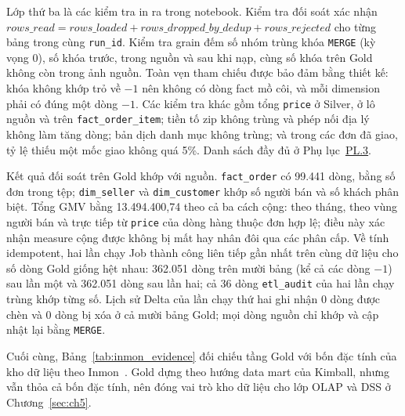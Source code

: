 \documentclass[a4paper]{article}
\begin{document}
Lớp thứ ba là các kiểm tra in ra trong notebook. Kiểm tra đối soát xác nhận $\textit{rows\_read} = \textit{rows\_loaded} + \textit{rows\_dropped\_by\_dedup} + \textit{rows\_rejected}$ cho từng bảng trong cùng \texttt{run\_id}. Kiểm tra grain đếm số nhóm trùng khóa \texttt{MERGE} (kỳ vọng 0), số khóa trước, trong nguồn và sau khi nạp, cùng số khóa trên Gold không còn trong ảnh nguồn. Toàn vẹn tham chiếu được bảo đảm bằng thiết kế: khóa không khớp trỏ về $-1$ nên không có dòng fact mồ côi, và mỗi dimension phải có đúng một dòng $-1$. Các kiểm tra khác gồm tổng \texttt{price} ở Silver, ở lô nguồn và trên \texttt{fact\_order\_item}; tiền tố zip không trùng và phép nối địa lý không làm tăng dòng; bản dịch danh mục không trùng; và trong các đơn đã giao, tỷ lệ thiếu một mốc giao không quá 5\%. Danh sách đầy đủ ở Phụ lục~\hyperref[pl:3]{PL.3}.

Kết quả đối soát trên Gold khớp với nguồn. \texttt{fact\_order} có 99.441 dòng, bằng số đơn trong tệp; \texttt{dim\_seller} và \texttt{dim\_customer} khớp số người bán và số khách phân biệt. Tổng GMV bằng 13.494.400,74 theo cả ba cách cộng: theo tháng, theo vùng người bán và trực tiếp từ \texttt{price} của dòng hàng thuộc đơn hợp lệ; điều này xác nhận measure cộng được không bị mất hay nhân đôi qua các phân cấp. Về tính idempotent, hai lần chạy Job thành công liên tiếp gần nhất trên cùng dữ liệu cho số dòng Gold giống hệt nhau: 362.051 dòng trên mười bảng (kể cả các dòng $-1$) sau lần một và 362.051 dòng sau lần hai; cả 36 dòng \texttt{etl\_audit} của hai lần chạy trùng khớp từng số. Lịch sử Delta của lần chạy thứ hai ghi nhận 0 dòng được chèn và 0 dòng bị xóa ở cả mười bảng Gold; mọi dòng nguồn chỉ khớp và cập nhật lại bằng \texttt{MERGE}.

Cuối cùng, Bảng~\ref{tab:inmon_evidence} đối chiếu tầng Gold với bốn đặc tính của kho dữ liệu theo Inmon~\cite{bib:inmon2005}. Gold dựng theo hướng data mart của Kimball, nhưng vẫn thỏa cả bốn đặc tính, nên đóng vai trò kho dữ liệu cho lớp OLAP và DSS ở Chương~\ref{sec:ch5}.
\end{document}

